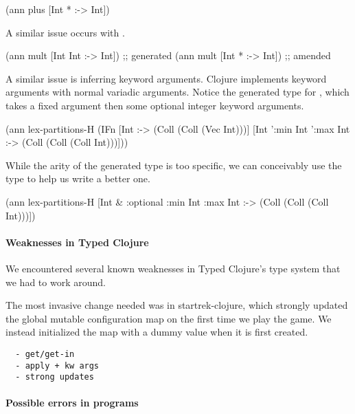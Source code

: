 \begin{cljlisting}
(ann plus [Int * :-> Int])
\end{cljlisting}

A similar issue occurs with .

\begin{cljlisting}
(ann mult [Int Int :-> Int]) ;; generated
(ann mult [Int * :-> Int])   ;; amended
\end{cljlisting}

A similar issue is inferring keyword arguments. Clojure implements
keyword arguments with normal variadic arguments. Notice
the generated type for ,
which takes a fixed argument then some optional integer keyword
arguments. 

\begin{cljlisting}
(ann lex-partitions-H
	(IFn [Int :-> (Coll (Coll (Vec Int)))]
		   [Int ':min Int ':max Int :-> (Coll (Coll (Coll Int)))]))
\end{cljlisting}

While the arity of the generated type is too specific,
we can conceivably use the type to help us write a better one.

\begin{cljlisting}
(ann lex-partitions-H [Int & :optional {:min Int :max Int} :-> (Coll (Coll (Coll Int)))])
\end{cljlisting}

\paragraph{Weaknesses in Typed Clojure}

We encountered several known weaknesses in Typed Clojure's type system
that we had to work around.

The most invasive change needed was in startrek-clojure, which
strongly updated the global mutable configuration map on the first
time we play the game. We instead initialized the map with a dummy
value when it is first created.

\begin{verbatim}
  - get/get-in
  - apply + kw args
  - strong updates
\end{verbatim}

\paragraph{Possible errors in programs}

